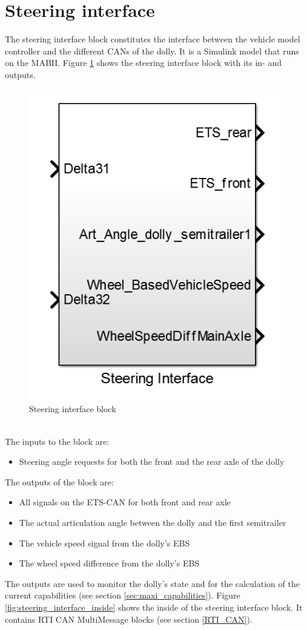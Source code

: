 \documentclass[ExampleMasters.tex]{subfiles}
\begin{document}
\section{Steering interface}
The steering interface block constitutes the interface between the vehicle model controller and the different CANs of the dolly. It is a Simulink model that runs on the MABII.
Figure \ref{fig:steering_interface} shows the steering interface block with its in- and outputs. 
\begin{figure}[h]
	\centering
	\includegraphics[width=0.5\linewidth]{figures/steering_interface}
	
	\caption{Steering interface block}
	\label{fig:steering_interface}
\end{figure} \\
The inputs to the block are:
\begin{itemize}
	\item Steering angle requests for both the front and  the rear axle of the dolly 
\end{itemize} 
 The outputs of the block are:
 \begin{itemize}
 	\item All signals on the ETS-CAN for both front and rear axle
 	\item The actual articulation angle between the dolly and the first semitrailer
 	\item The vehicle speed signal from the dolly's EBS
 	\item The wheel speed difference from the dolly's EBS
 \end{itemize}
 The outputs are used to monitor the dolly's state and for the calculation of the current capabilities (see section \ref{sec:maxi_capabilities}).
 Figure \ref{fig:steering_interface_inside} shows the inside of the steering interface block. It contains RTI CAN MultiMessage blocks (see section \ref{RTI_CAN}).   
 
\end{document}
